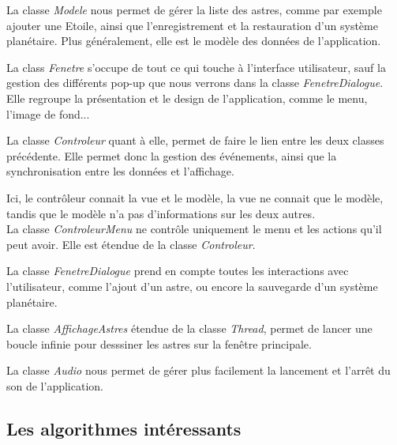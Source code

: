 \documentclass[a4paper,10pt]{article}
\begin{document}
La classe \textit{Modele} nous permet de gérer la liste des astres, comme par exemple ajouter une Etoile, ainsi que l'enregistrement et la restauration d'un système planétaire. Plus généralement, elle est le modèle des données de l'application.

La class \textit{Fenetre} s'occupe de tout ce qui touche à l'interface utilisateur, sauf la gestion des différents pop-up que nous verrons dans la classe \textit{FenetreDialogue}. Elle regroupe la présentation et le design de l'application, comme le menu, l'image de fond...

La classe \textit{Controleur} quant à elle, permet de faire le lien entre les deux classes précédente. Elle permet donc la gestion des événements, ainsi que la synchronisation entre les données et l'affichage.

Ici, le contrôleur connait la vue et le modèle, la vue ne connait que le modèle, tandis que le modèle n'a pas d'informations sur les deux autres.\\

La classe \textit{ControleurMenu} ne contrôle uniquement le menu et les actions qu'il peut avoir. Elle est étendue de la classe \textit{Controleur}.

La classe \textit{FenetreDialogue} prend en compte toutes les interactions avec l'utilisateur, comme l'ajout d'un astre, ou encore la sauvegarde d'un système planétaire.

La classe \textit{AffichageAstres} étendue de la classe \textit{Thread}, permet de lancer une boucle infinie pour desssiner les astres sur la fenêtre principale.

La classe \textit{Audio} nous permet de gérer plus facilement la lancement et l'arrêt du son de l'application.

\newpage
\subsection{Les algorithmes intéressants}
\end{document}
